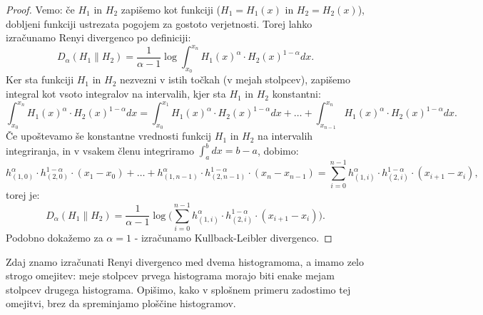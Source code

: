 \begin{proof}
    Vemo: če $H_1$ in $H_2$ zapišemo kot funkciji ($H_1 = H_1 (x)$ in $H_2 = H_2(x)$), dobljeni funkciji ustrezata pogojem za gostoto verjetnosti. Torej lahko izračunamo Renyi divergenco po definiciji:
    \begin{equation}
        D_{\alpha} (H_1 \| H_2) = \frac{1}{\alpha-1} \log\int_{x_0}^{x_n} H_1(x)^\alpha \cdot H_2(x)^{1-\alpha} dx.
    \end{equation}
    Ker sta funkciji $H_1$ in $H_2$ nezvezni v istih točkah (v mejah stolpcev), zapišemo integral kot vsoto integralov na intervalih, kjer sta $H_1$ in $H_2$ konstantni:
    \begin{equation}
        \int_{x_0}^{x_n} H_1(x)^\alpha \cdot H_2(x)^{1-\alpha} dx = \int_{x_0}^{x_1} H_1(x)^\alpha \cdot H_2(x)^{1-\alpha} dx + \ldots + \int_{x_{n-1}}^{x_n} H_1(x)^\alpha \cdot H_2(x)^{1-\alpha} dx.
    \end{equation}
    Če upoštevamo še konstantne vrednosti funkcij $H_1$ in $H_2$ na intervalih integriranja, in v vsakem členu integriramo $\int_a^b dx = b-a$, dobimo:
    \begin{equation}
        h_{(1,0)}^\alpha\cdot h_{(2,0)}^{1-\alpha}\cdot (x_1-x_0) + \ldots + h_{(1,n-1)}^\alpha\cdot h_{(2,n-1)}^{1-\alpha}\cdot (x_n-x_{n-1}) = \sum_{i=0}^{n-1} h_{(1,i)}^\alpha \cdot h_{(2,i)}^{1-\alpha} \cdot (x_{i+1}-x_i),
    \end{equation}
    torej je:
    \begin{equation}
        D_\alpha (H_1 \| H_2) = \frac{1}{\alpha-1} \log\Big(\sum_{i=0}^{n-1} h_{(1,i)}^\alpha \cdot h_{(2,i)}^{1-\alpha} \cdot (x_{i+1}-x_i)\Big).
    \end{equation}
    Podobno dokažemo za $\alpha = 1$ - izračunamo Kullback-Leibler divergenco.
\end{proof}

Zdaj znamo izračunati Renyi divergenco med dvema histogramoma, a imamo zelo strogo omejitev: meje stolpcev prvega histograma morajo biti enake mejam stolpcev drugega histograma. Opišimo, kako v splošnem primeru zadostimo tej omejitvi, brez da spreminjamo ploščine histogramov.


\pagebreak
